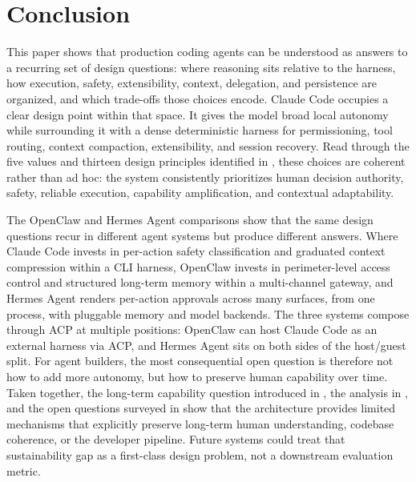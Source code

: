 \section{Conclusion}
\label{sec:conclude}

This paper shows that production coding agents can be understood as answers to a recurring set of design questions: where reasoning sits relative to the harness, how execution, safety, extensibility, context, delegation, and persistence are organized, and which trade-offs those choices encode. Claude Code occupies a clear design point within that space. It gives the model broad local autonomy while surrounding it with a dense deterministic harness for permissioning, tool routing, context compaction, extensibility, and session recovery. Read through the five values and thirteen design principles identified in , these choices are coherent rather than ad hoc: the system consistently prioritizes human decision authority, safety, reliable execution, capability amplification, and contextual adaptability.

The OpenClaw and Hermes Agent comparisons show that the same design questions recur in different agent systems but produce different answers. Where Claude Code invests in per-action safety classification and graduated context compression within a CLI harness, OpenClaw invests in perimeter-level access control and structured long-term memory within a multi-channel gateway, and Hermes Agent renders per-action approvals across many surfaces, from one process, with pluggable memory and model backends. The three systems compose through ACP at multiple positions: OpenClaw can host Claude Code as an external harness via ACP, and Hermes Agent sits on both sides of the host/guest split. For agent builders, the most consequential open question is therefore not how to add more autonomy, but how to preserve human capability over time. Taken together, the long-term capability question introduced in , the analysis in , and the open questions surveyed in  show that the architecture provides limited mechanisms that explicitly preserve long-term human understanding, codebase coherence, or the developer pipeline. Future systems could treat that sustainability gap as a first-class design problem, not a downstream evaluation metric.
